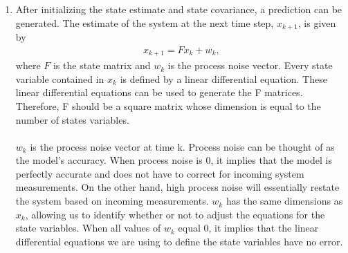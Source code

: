 \begin{enumerate}
   
  \item After initializing the state estimate and state covariance, a prediction can be generated. The estimate of the system at the next time step, $x_{k+1}$,  is given by
  \begin{align*}
      x_{k+1} = F x_{k} + w_{k} ,
  \end{align*} 
  where $F$ is the state matrix and $w_k$ is the process noise vector. Every state variable contained in $x_k$ is defined by a linear differential equation. These linear differential equations can be used to generate the F matrices. Therefore, F should be a square matrix whose dimension is equal to the number of states variables. \\ \\
  $w_k$ is the process noise vector at time k. Process noise can be thought of as the model's accuracy. When process noise is 0, it implies that the model is perfectly accurate and does not have to correct for incoming system measurements. On the other hand, high process noise will essentially restate the system based on incoming measurements. $w_k$ has the same dimensions as $x_k$, allowing us to identify whether or not to adjust the equations for the state variables. When all values of  $w_k$ equal 0, it implies that the linear differential equations we are using to define the state variables have no error. 
  
  
  

\end{enumerate}
